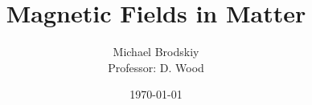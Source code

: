 


\title{Magnetic Fields in Matter}
\date{\today}
\author{Michael Brodskiy\\ \small Professor: D. Wood}



\maketitle

